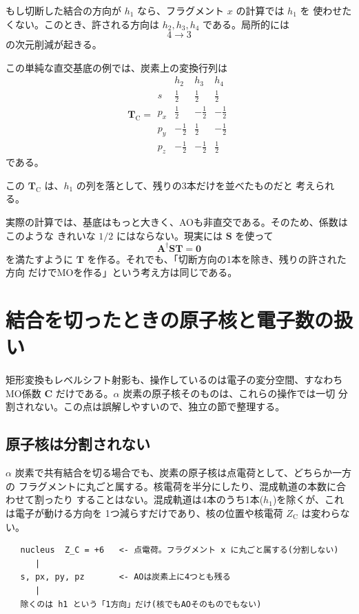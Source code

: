 \documentclass[uplatex,dvipdfmx,11pt]{jsarticle}
\newcommand{\Smat}{\mathbf S}
\newcommand{\Amat}{\mathbf A}
\newcommand{\Tmat}{\mathbf T}
\newcommand{\Cmat}{\mathbf C}
\begin{document}
もし切断した結合の方向が \(h_1\) なら、フラグメント \(x\) の計算では \(h_1\) を
使わせたくない。このとき、許される方向は \(h_2,h_3,h_4\) である。局所的には
\[
  4\to 3
\]
の次元削減が起きる。

この単純な直交基底の例では、炭素上の変換行列は
\[
\Tmat_{\mathrm C}
=
\begin{array}{c|ccc}
 & h_2 & h_3 & h_4\\
\hline
s   & \frac12 & \frac12  & \frac12 \\
p_x & \frac12 & -\frac12 & -\frac12 \\
p_y & -\frac12 & \frac12 & -\frac12 \\
p_z & -\frac12 & -\frac12 & \frac12
\end{array}
\]
である。

この \(\Tmat_{\mathrm C}\) は、\(h_1\) の列を落として、残りの3本だけを並べたものだと
考えられる。

実際の計算では、基底はもっと大きく、AOも非直交である。そのため、係数はこのような
きれいな \(1/2\) にはならない。現実には \(\Smat\) を使って
\[
  \Amat^\dagger\Smat\Tmat=\mathbf 0
\]
を満たすように \(\Tmat\) を作る。それでも、「切断方向の1本を除き、残りの許された方向
だけでMOを作る」という考え方は同じである。

\section{結合を切ったときの原子核と電子数の扱い}

矩形変換もレベルシフト射影も、操作しているのは電子の変分空間、すなわちMO係数
\(\Cmat\) だけである。\(\alpha\) 炭素の原子核そのものは、これらの操作では一切
分割されない。この点は誤解しやすいので、独立の節で整理する。

\subsection{原子核は分割されない}

\(\alpha\) 炭素で共有結合を切る場合でも、炭素の原子核は点電荷として、どちらか一方の
フラグメントに丸ごと属する。核電荷を半分にしたり、混成軌道の本数に合わせて割ったり
することはない。混成軌道は4本のうち1本(\(h_1\))を除くが、これは電子が動ける方向を
1つ減らすだけであり、核の位置や核電荷 \(Z_{\mathrm C}\) は変わらない。

\begin{verbatim}
   nucleus  Z_C = +6   <- 点電荷。フラグメント x に丸ごと属する(分割しない)
      |
   s, px, py, pz       <- AOは炭素上に4つとも残る
      |
   除くのは h1 という「1方向」だけ(核でもAOそのものでもない)
\end{verbatim}
\end{document}
